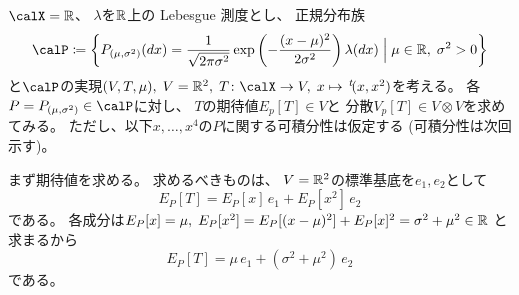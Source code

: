 \documentclass[report]{jlreq}
\begin{document}
\begin{example}[正規分布族の十分統計量の期待値と分散]
    $\calX = \R$、
    $\lambda$を$\mathbb{R}$上の Lebesgue 測度とし、
    正規分布族
    \begin{equation}
        \calP \coloneqq \mybrace{
            P_{(\mu, \sigma^2)}(dx)
                = \frac{1}{\sqrt{2\pi\sigma^2}} \exp\myparen{
                    -\frac{(x - \mu)^2}{2\sigma^2}
                } \lambda(dx)
            \;\Big|\;
            \mu \in \R, \; \sigma^2 > 0
        }
    \end{equation}
    と$\calP$の実現$(V, T, \mu), \;
        V = \R^2, \;
        T \colon \calX \to V, \;
        x \mapsto \up{t}(x, x^2)$を考える。
    各$P = P_{(\mu, \sigma^2)} \in \calP$に対し、
    $T$の期待値$E_p[T] \in V$と
    分散$V_p[T] \in V \otimes V$を求めてみる。
    ただし、以下$x, \dots, x^4$の$P$に関する可積分性は仮定する
    (可積分性は次回示す)。

    まず期待値を求める。
    求めるべきものは、
    $V = \mathbb{R}^2$の標準基底を$e_1, e_2$として
    \begin{equation}
        E_P[T]
            = E_P[x] \, e_1 + E_P[x^2] \, e_2
    \end{equation}
    である。
    各成分は$E_P[x] = \mu, \;
        E_P[x^2]
            = E_P[(x - \mu)^2] + E_P[x]^2
            = \sigma^2 + \mu^2 \in \mathbb{R}$
    と求まるから
    \begin{equation}
        E_P[T]
            = \mu \, e_1 + (\sigma^2 + \mu^2) \, e_2
    \end{equation}
    である。


\end{example}
\end{document}
